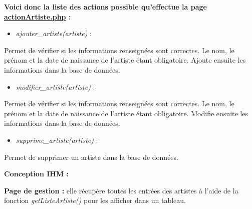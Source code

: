 			\begin{paragraphe}
                \textbf{Voici donc la liste des actions possible qu'effectue la page \underline{actionArtiste.php} :}
            
                \begin{itemize}
                    \item \emph{ajouter\_artiste(artiste)} :
                \end{itemize}
                \begin{paragraphe}
                    Permet de vérifier si les informations renseignées sont correctes. Le nom, le prénom et la date de naissance de l'artiste étant obligatoire. Ajoute ensuite les informations dans la base de données.
                \end{paragraphe}
                
                \begin{itemize}
                    \item \emph{modifier\_artiste(artiste)} :
                \end{itemize}
                \begin{paragraphe}
                    Permet de vérifier si les informations renseignées sont correctes. Le nom, le prénom et la date de naissance de l'artiste étant obligatoire. Modifie ensuite les informations dans la base de données.
                \end{paragraphe}
                
                \begin{itemize}
                    \item \emph{supprime\_artiste(artiste)} :
                \end{itemize}
                \begin{paragraphe}
                    Permet de supprimer un artiste dans la base de données.
                \end{paragraphe}
            \end{paragraphe}

			\begin{paragraphe}
				\textbf{Conception IHM :}
			\end{paragraphe}
            
            \begin{paragraphe}
                \textbf{Page de gestion :} elle récupère toutes les entrées des artistes à l'aide de la fonction \emph{getListeArtiste()} pour les afficher dans un tableau.
            \end{paragraphe}

